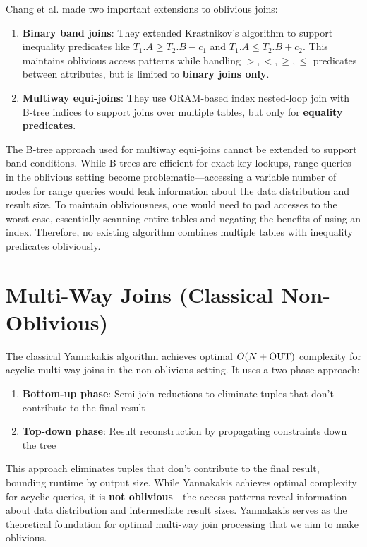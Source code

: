 Chang et al. made two important extensions to oblivious joins:

\begin{enumerate}
\item \textbf{Binary band joins}: They extended Krastnikov's algorithm to support inequality predicates like $T_1.A \geq T_2.B - c_1$ and $T_1.A \leq T_2.B + c_2$. This maintains oblivious access patterns while handling $>, <, \geq, \leq$ predicates between attributes, but is limited to \textbf{binary joins only}.

\item \textbf{Multiway equi-joins}: They use ORAM-based index nested-loop join with B-tree indices to support joins over multiple tables, but only for \textbf{equality predicates}.
\end{enumerate}

The B-tree approach used for multiway equi-joins cannot be extended to support band conditions. While B-trees are efficient for exact key lookups, range queries in the oblivious setting become problematic---accessing a variable number of nodes for range queries would leak information about the data distribution and result size. To maintain obliviousness, one would need to pad accesses to the worst case, essentially scanning entire tables and negating the benefits of using an index. Therefore, no existing algorithm combines multiple tables with inequality predicates obliviously.

\section{Multi-Way Joins (Classical Non-Oblivious)}

The classical Yannakakis algorithm achieves optimal $O(N + \text{OUT})$ complexity for acyclic multi-way joins in the non-oblivious setting. It uses a two-phase approach:

\begin{enumerate}
\item \textbf{Bottom-up phase}: Semi-join reductions to eliminate tuples that don't contribute to the final result
\item \textbf{Top-down phase}: Result reconstruction by propagating constraints down the tree
\end{enumerate}

This approach eliminates tuples that don't contribute to the final result, bounding runtime by output size. While Yannakakis achieves optimal complexity for acyclic queries, it is \textbf{not oblivious}---the access patterns reveal information about data distribution and intermediate result sizes. Yannakakis serves as the theoretical foundation for optimal multi-way join processing that we aim to make oblivious.

